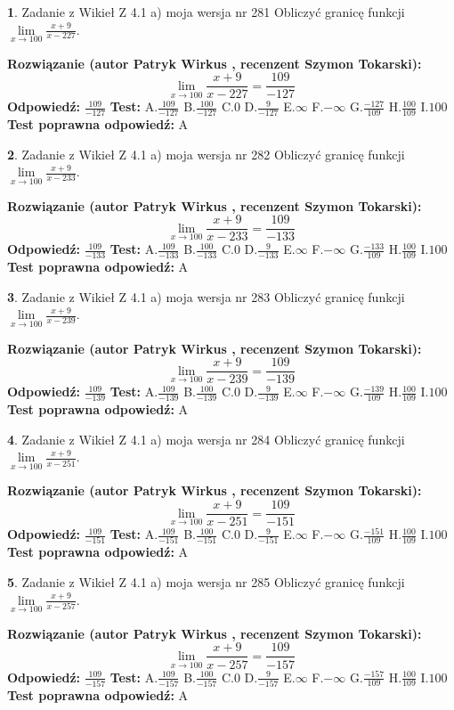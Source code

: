 \documentclass[12pt, a4paper]{article}
\theoremstyle{definition} %
\newtheorem{zad}{}
\newcommand{\zadStart}[1]{\begin{zad}#1\newline}
\newcommand{\zadStop}{\end{zad}}
\newcommand{\rozwStart}[2]{\noindent \textbf{Rozwiązanie (autor #1 , recenzent #2): }\newline}
\newcommand{\rozwStop}{\newline}
\newcommand{\odpStart}{\noindent \textbf{Odpowiedź:}\newline}
\newcommand{\odpStop}{\newline}
\newcommand{\testStart}{\noindent \textbf{Test:}\newline}
\newcommand{\testStop}{\newline}
\newcommand{\kluczStart}{\noindent \textbf{Test poprawna odpowiedź:}\newline}
\newcommand{\kluczStop}{\newline}
\begin{document}
\zadStart{Zadanie z Wikieł Z 4.1 a) moja wersja nr 281}
Obliczyć granicę funkcji $\lim\limits_{x\to100}\frac{x+9}{x-227}$.
\zadStop
\rozwStart{Patryk Wirkus}{Szymon Tokarski}
$$\lim\limits_{x\to100}\frac{x+9}{x-227} = \frac{109}{-127}$$
\rozwStop
\odpStart
$\frac{109}{-127}$
\odpStop
\testStart
A.$\frac{109}{-127}$
B.$\frac{100}{-127}$
C.$0$
D.$\frac{9}{-127}$
E.$\infty$
F.$-\infty$
G.$\frac{-127}{109}$
H.$\frac{100}{109}$
I.$100$
\testStop
\kluczStart
A
\kluczStop



\zadStart{Zadanie z Wikieł Z 4.1 a) moja wersja nr 282}
Obliczyć granicę funkcji $\lim\limits_{x\to100}\frac{x+9}{x-233}$.
\zadStop
\rozwStart{Patryk Wirkus}{Szymon Tokarski}
$$\lim\limits_{x\to100}\frac{x+9}{x-233} = \frac{109}{-133}$$
\rozwStop
\odpStart
$\frac{109}{-133}$
\odpStop
\testStart
A.$\frac{109}{-133}$
B.$\frac{100}{-133}$
C.$0$
D.$\frac{9}{-133}$
E.$\infty$
F.$-\infty$
G.$\frac{-133}{109}$
H.$\frac{100}{109}$
I.$100$
\testStop
\kluczStart
A
\kluczStop



\zadStart{Zadanie z Wikieł Z 4.1 a) moja wersja nr 283}
Obliczyć granicę funkcji $\lim\limits_{x\to100}\frac{x+9}{x-239}$.
\zadStop
\rozwStart{Patryk Wirkus}{Szymon Tokarski}
$$\lim\limits_{x\to100}\frac{x+9}{x-239} = \frac{109}{-139}$$
\rozwStop
\odpStart
$\frac{109}{-139}$
\odpStop
\testStart
A.$\frac{109}{-139}$
B.$\frac{100}{-139}$
C.$0$
D.$\frac{9}{-139}$
E.$\infty$
F.$-\infty$
G.$\frac{-139}{109}$
H.$\frac{100}{109}$
I.$100$
\testStop
\kluczStart
A
\kluczStop



\zadStart{Zadanie z Wikieł Z 4.1 a) moja wersja nr 284}
Obliczyć granicę funkcji $\lim\limits_{x\to100}\frac{x+9}{x-251}$.
\zadStop
\rozwStart{Patryk Wirkus}{Szymon Tokarski}
$$\lim\limits_{x\to100}\frac{x+9}{x-251} = \frac{109}{-151}$$
\rozwStop
\odpStart
$\frac{109}{-151}$
\odpStop
\testStart
A.$\frac{109}{-151}$
B.$\frac{100}{-151}$
C.$0$
D.$\frac{9}{-151}$
E.$\infty$
F.$-\infty$
G.$\frac{-151}{109}$
H.$\frac{100}{109}$
I.$100$
\testStop
\kluczStart
A
\kluczStop



\zadStart{Zadanie z Wikieł Z 4.1 a) moja wersja nr 285}
Obliczyć granicę funkcji $\lim\limits_{x\to100}\frac{x+9}{x-257}$.
\zadStop
\rozwStart{Patryk Wirkus}{Szymon Tokarski}
$$\lim\limits_{x\to100}\frac{x+9}{x-257} = \frac{109}{-157}$$
\rozwStop
\odpStart
$\frac{109}{-157}$
\odpStop
\testStart
A.$\frac{109}{-157}$
B.$\frac{100}{-157}$
C.$0$
D.$\frac{9}{-157}$
E.$\infty$
F.$-\infty$
G.$\frac{-157}{109}$
H.$\frac{100}{109}$
I.$100$
\testStop
\kluczStart
A
\kluczStop
\end{document}
